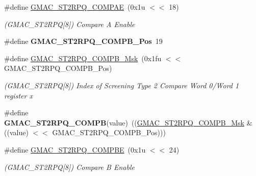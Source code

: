 \begin{DoxyCompactItemize}
\item 
\mbox{\label{group__SAME70__GMAC_ga09be0172b68656354ed4ed18b0f3c312}} 
\#define \mbox{\hyperlink{group__SAME70__GMAC_ga09be0172b68656354ed4ed18b0f3c312}{G\+M\+A\+C\+\_\+\+S\+T2\+R\+P\+Q\+\_\+\+C\+O\+M\+P\+AE}}~(0x1u $<$$<$ 18)
\begin{DoxyCompactList}\small\item\em (G\+M\+A\+C\+\_\+\+S\+T2\+R\+PQ\mbox{[}8\mbox{]}) Compare A Enable \end{DoxyCompactList}\item 
\mbox{\label{group__SAME70__GMAC_ga1d1452eecd6eeaffde85eba1fe5d939c}} 
\#define {\bfseries G\+M\+A\+C\+\_\+\+S\+T2\+R\+P\+Q\+\_\+\+C\+O\+M\+P\+B\+\_\+\+Pos}~19
\item 
\mbox{\label{group__SAME70__GMAC_gab8a1d6edf87aa020f9ac5dab012c499d}} 
\#define \mbox{\hyperlink{group__SAME70__GMAC_gab8a1d6edf87aa020f9ac5dab012c499d}{G\+M\+A\+C\+\_\+\+S\+T2\+R\+P\+Q\+\_\+\+C\+O\+M\+P\+B\+\_\+\+Msk}}~(0x1fu $<$$<$ G\+M\+A\+C\+\_\+\+S\+T2\+R\+P\+Q\+\_\+\+C\+O\+M\+P\+B\+\_\+\+Pos)
\begin{DoxyCompactList}\small\item\em (G\+M\+A\+C\+\_\+\+S\+T2\+R\+PQ\mbox{[}8\mbox{]}) Index of Screening Type 2 Compare Word 0/\+Word 1 register x \end{DoxyCompactList}\item 
\mbox{\label{group__SAME70__GMAC_ga644a6210cb06bcadc068e96ebab0485b}} 
\#define {\bfseries G\+M\+A\+C\+\_\+\+S\+T2\+R\+P\+Q\+\_\+\+C\+O\+M\+PB}(value)~((\mbox{\hyperlink{group__SAMV71__GMAC_gab8a1d6edf87aa020f9ac5dab012c499d}{G\+M\+A\+C\+\_\+\+S\+T2\+R\+P\+Q\+\_\+\+C\+O\+M\+P\+B\+\_\+\+Msk}} \& ((value) $<$$<$ G\+M\+A\+C\+\_\+\+S\+T2\+R\+P\+Q\+\_\+\+C\+O\+M\+P\+B\+\_\+\+Pos)))
\item 
\mbox{\label{group__SAME70__GMAC_ga94950b5b38ad5b929bd50b14482c4dda}} 
\#define \mbox{\hyperlink{group__SAME70__GMAC_ga94950b5b38ad5b929bd50b14482c4dda}{G\+M\+A\+C\+\_\+\+S\+T2\+R\+P\+Q\+\_\+\+C\+O\+M\+P\+BE}}~(0x1u $<$$<$ 24)
\begin{DoxyCompactList}\small\item\em (G\+M\+A\+C\+\_\+\+S\+T2\+R\+PQ\mbox{[}8\mbox{]}) Compare B Enable \end{DoxyCompactList}\item 

\end{DoxyCompactItemize}
